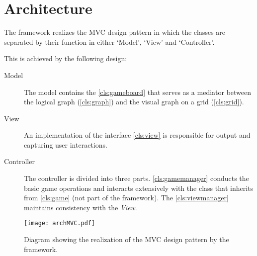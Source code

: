 \section{Architecture}
The \graphioli framework realizes the \gls{MVC} design pattern in which the classes are separated by their function in either `Model', `View' and `Controller'.\par
This is achieved by the following design:\par

\begin{description}
	\item[Model] The model contains the \ref{cls:gameboard} that serves as a mediator between the logical \gls{graph} (\ref{cls:graph}) and the visual graph on a \gls{grid} (\ref{cls:grid}).
	\item[View] An implementation of the \gls{interface} \ref{cls:view} is responsible for output and capturing user interactions.
	\item[Controller] The controller is divided into three parts. \ref{cls:gamemanager} conducts the basic game operations and interacts extensively with the class that inherits from \ref{cls:game} (not part of the framework). The \ref{cls:viewmanager} maintains consistency with the \emph{View}.
\end{description}

\begin{figure}[h]
	\centering
	\texttt{[image: archMVC.pdf]}
	\caption{Diagram showing the realization of the \gls{MVC} design pattern by the framework.}
	\label{img:archMVC}
\end{figure}